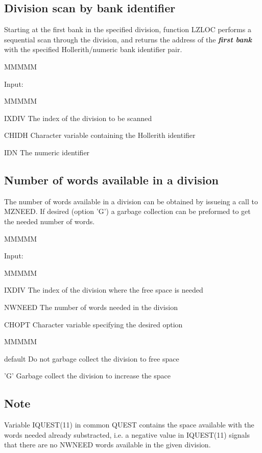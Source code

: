 \subsection{Division scan by bank identifier}
\par Starting at the first bank in the specified division,
function LZLOC performs a sequential scan through the
division, and returns
the address of the {\bf\it first bank} with the specified
Hollerith/numeric bank identifier pair.
\begin{DL}{MMMMM}
\item[Input:
]
\begin{DL}{MMMMM}
\item[IXDIV
]The index of the division to be scanned
\item[CHIDH
]Character variable containing the Hollerith identifier
\item[IDN
]The numeric identifier
\end{DL}
\end{DL}
\subsection{Number of words available in a division}
\par The number of words available in a division can be obtained
by issueing a call to MZNEED.
If desired (option 'G') a garbage collection can be preformed to
get the needed number of words.
\begin{DL}{MMMMM}
\item[Input:
]
\begin{DL}{MMMMM}
\item[IXDIV
]The index of the division where the free space is needed
\item[NWNEED
]The number of words needed in the division
\item[CHOPT
]Character variable specifying the desired option
\begin{DL}{MMMMM}
\item[default
]Do not garbage collect the division to free space
\item['G'
]Garbage collect the division to increase the space
\end{DL}
\end{DL}
\end{DL}
\subsection{Note}
\par Variable IQUEST(11) in common QUEST contains the space
available with the words needed already substracted,
i.e. a negative value in IQUEST(11) signals that there are
no NWNEED words available in the given division.
